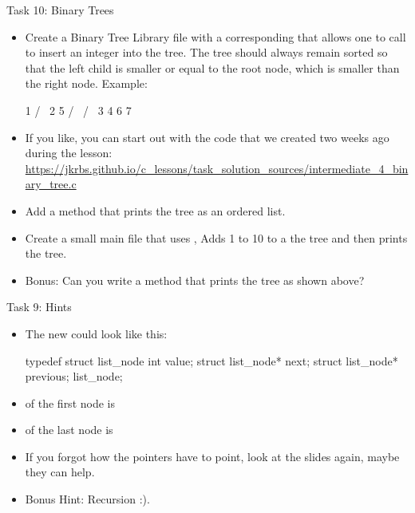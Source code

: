 \documentclass[10pt,graphics,aspectratio=169,table]{beamer}
\begin{document}
\begin{frame}[fragile]{Task 10: Binary Trees}

    \begin{itemize}
        \item Create a Binary Tree Library file  with a corresponding
             that allows one to call  to insert 
            an integer into the tree.
            The tree should always remain sorted so that the left child is smaller 
            or equal to the root node, which is smaller than the right node.
            Example:
            \begin{codeblock}
    1  
   / \
  2   5
 / \ / \
3  4 6  7
            \end{codeblock}

      
        \item If you like, you can start out with the code that we created 
              two weeks ago during the lesson:
        \tiny
        \url{https://jkrbs.github.io/c_lessons/task_solution_sources/intermediate_4_binary_tree.c}
        
        \normalsize

        \item Add a  method that prints the tree as an ordered list.

        \item Create a small main file that uses \code{tree.h},
              Adds 1 to 10 to a the tree and then prints the tree.
              
        \item Bonus: Can you write a method that prints the tree as shown above?
    \end{itemize}

\end{frame}

\begin{frame}[fragile]{Task 9: Hints}
    \begin{itemize}
        \item The new  could look like this:
            \begin{codeblock}
typedef struct list_node {
    int value;    
    struct list_node* next;
    struct list_node* previous;
} list_node;
            \end{codeblock}

        \item {} of the first node is 
        \item {} of the last node is  
        \item If you forgot how the pointers have to point, 
              look at the slides again, maybe they can help.
        
        \item Bonus Hint: Recursion :).
\end{itemize}
   
    
\end{frame}
\end{document}
